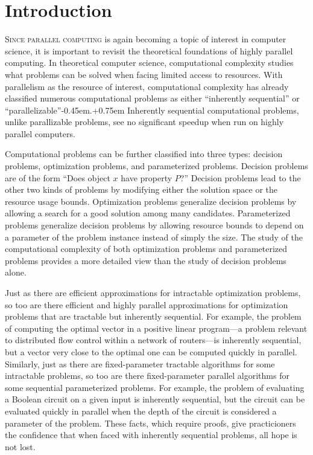 \chapter{Introduction}

%
%
%
\lettrine[loversize=0.1, lhang=0.05, findent=0.2em, nindent=0em]{S}{ince parallel computing} is again becoming a topic of interest in computer science, it is important to revisit the theoretical foundations of highly parallel computing.
In theoretical computer science, computational complexity studies what problems can be solved when facing limited access to resources.
With parallelism as the resource of interest, computational complexity has already classified numerous computational problems as either ``inherently sequential'' or ``parallelizable''\kern-0.45em.\kern+0.75em
Inherently sequential computational problems, unlike parallizable problems, see no significant speedup when run on highly parallel computers.

Computational problems can be further classified into three types: decision problems, optimization problems, and parameterized problems.
Decision problems are of the form ``Does object $x$ have property $P$?''
Decision problems lead to the other two kinds of problems by modifying either the solution space or the resource usage bounds.
Optimization problems generalize decision problems by allowing a search for a good solution among many candidates.
Parameterized problems generalize decision problems by allowing resource bounds to depend on a parameter of the problem instance instead of simply the size.
The study of the computational complexity of both optimization problems and parameterized problems provides a more detailed view than the study of decision problems alone.

%
%
%
Just as there are efficient approximations for intractable optimization problems, so too are there efficient and highly parallel approximations for optimization problems that are tractable but inherently sequential.
For example, the problem of computing the optimal vector in a positive linear program---a problem relevant to distributed flow control within a network of routers---is inherently sequential, but a vector very close to the optimal one can be computed quickly in parallel.
Similarly, just as there are fixed-parameter tractable algorithms for some intractable problems, so too are there fixed-parameter parallel algorithms for some sequential parameterized problems.
For example, the problem of evaluating a Boolean circuit on a given input is inherently sequential, but the circuit can be evaluated quickly in parallel when the depth of the circuit is considered a parameter of the problem.
These facts, which require proofs, give practicioners the confidence that when faced with inherently sequential problems, all hope is not lost.

